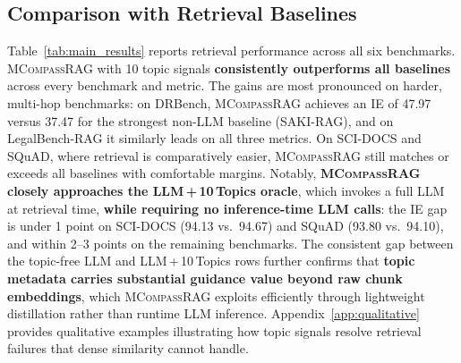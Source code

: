 \documentclass{llmxive}
\providecommand{\name}[1]{\textsc{MCompassRAG}\xspace}
\begin{document}
\subsection{Comparison with Retrieval Baselines}
\label{subsec:retrieval_comparison}

Table~\ref{tab:main_results} reports retrieval performance across all six benchmarks. \name{} with 10 topic signals \textbf{consistently outperforms all baselines} across every benchmark and metric. The gains are most pronounced on harder, multi-hop benchmarks: on DRBench, \name{} achieves an IE of 47.97 versus 37.47 for the strongest non-LLM baseline (SAKI-RAG), and on LegalBench-RAG it similarly leads on all three metrics. On SCI-DOCS and SQuAD, where retrieval is comparatively easier, \name{} still matches or exceeds all baselines with comfortable margins. Notably, \textbf{\name{} closely approaches the LLM\,+\,10\,Topics oracle}, which invokes a full LLM at retrieval time, \textbf{while requiring no inference-time LLM calls}: the IE gap is under 1 point on SCI-DOCS (94.13 vs.\ 94.67) and SQuAD (93.80 vs.\ 94.10), and within 2--3 points on the remaining benchmarks. The consistent gap between the topic-free LLM and LLM\,+\,10\,Topics rows further confirms that \textbf{topic metadata carries substantial guidance value beyond raw chunk embeddings}, which \name{} exploits efficiently through lightweight distillation rather than
runtime LLM inference. Appendix~\ref{app:qualitative} provides qualitative examples illustrating how topic signals resolve retrieval failures that dense similarity cannot handle.
\end{document}
